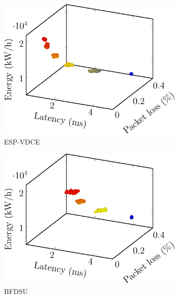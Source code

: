 \begin{figure}[t!]
\begin{subfigure}[b]{0.19\linewidth}
        \includegraphics[width=\textwidth]{graphs/comparison/esp_vdce-crop}
        \caption{ESP-VDCE \cite{KaurGK020}}
    \end{subfigure}
    \begin{subfigure}[b]{0.19\linewidth}
        \includegraphics[width=\textwidth]{graphs/comparison/bfdsu-crop}
        \caption{BFDSU \cite{ZhangXLLGW17}}
    \end{subfigure}
    \begin{subfigure}[b]{0.19\linewidth}

\end{subfigure}
\end{figure}
